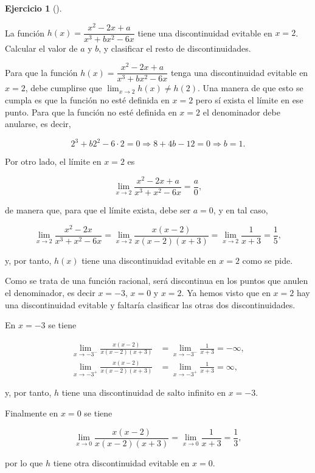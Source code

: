 \documentclass[
  spanish,
  a4paper,
]{scrreport}
\theoremstyle{definition}
\newtheorem{exercise}{Ejercicio}[chapter]
\theoremstyle{remark}
\begin{document}
\begin{exercise}[]\protect\hypertarget{exr-7}{}\label{exr-7}

La función \(h(x)=\dfrac{x^2-2x+a}{x^3+bx^2-6x}\) tiene una
discontinuidad evitable en \(x=2\). Calcular el valor de \(a\) y \(b\),
y clasificar el resto de discontinuidades.

\end{exercise}

\begin{tcolorbox}[enhanced jigsaw, arc=.35mm, bottomrule=.15mm, bottomtitle=1mm, breakable, colback=white, colbacktitle=quarto-callout-tip-color!10!white, colframe=quarto-callout-tip-color-frame, coltitle=black, left=2mm, leftrule=.75mm, opacityback=0, opacitybacktitle=0.6, rightrule=.15mm, title=\textcolor{quarto-callout-tip-color}{\faLightbulb}\hspace{0.5em}{Solución}, titlerule=0mm, toprule=.15mm, toptitle=1mm]

Para que la función \(h(x)=\dfrac{x^2-2x+a}{x^3+bx^2-6x}\) tenga una
discontinuidad evitable en \(x=2\), debe cumplirse que
\(\lim_{x\to 2}h(x)\neq h(2)\). Una manera de que esto se cumpla es que
la función no esté definida en \(x=2\) pero sí exista el límite en ese
punto. Para que la función no esté definida en \(x=2\) el denominador
debe anularse, es decir,

\[
2^3+b2^2-6\cdot 2=0\Rightarrow 8+4b-12 =0 \Rightarrow b=1.
\]

Por otro lado, el límite en \(x=2\) es

\[
\lim_{x\to 2}\frac{x^2-2x+a}{x^3+x^2-6x} = \frac{a}{0},
\]

de manera que, para que el límite exista, debe ser \(a=0\), y en tal
caso,

\[
\lim_{x\to 2}\frac{x^2-2x}{x^3+x^2-6x} = \lim_{x\to 2}\frac{x(x-2)}{x(x-2)(x+3)} = \lim_{x\to 2}\frac{1}{x+3} = \frac{1}{5},
\]

y, por tanto, \(h(x)\) tiene una discontinuidad evitable en \(x=2\) como
se pide.

Como se trata de una función racional, será discontinua en los puntos
que anulen el denominador, es decir \(x=-3\), \(x=0\) y \(x=2\). Ya
hemos visto que en \(x=2\) hay una discontinuidad evitable y faltaría
clasificar las otras dos discontinuidades.

En \(x=-3\) se tiene

\[
\begin{aligned} 
\lim_{x\to -3^-}\frac{x(x-2)}{x(x-2)(x+3)} &= \lim_{x\to -3^-}\frac{1}{x+3} = -\infty,\\
\lim_{x\to -3^+}\frac{x(x-2)}{x(x-2)(x+3)} &= \lim_{x\to -3^+}\frac{1}{x+3} = \infty, 
\end{aligned}
\]

y, por tanto, \(h\) tiene una discontinuidad de salto infinito en
\(x=-3\).

Finalmente en \(x=0\) se tiene

\[\lim_{x\to 0} \frac{x(x-2)}{x(x-2)(x+3)} = \lim_{x\to 0}\frac{1}{x+3} = \frac{1}{3},\]

por lo que \(h\) tiene otra discontinuidad evitable en \(x=0\).

\end{tcolorbox}
\end{document}
